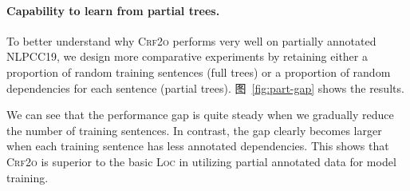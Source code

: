 \paragraph{Capability to learn from partial trees.}

To better understand why \textsc{Crf2o} performs very well on partially annotated NLPCC19,
we design more comparative experiments by retaining either a proportion of random training sentences (full trees) or a proportion of random dependencies for each sentence (partial trees).
图~\ref{fig:part-gap} shows the results.

We can see that the performance gap is quite steady
when we gradually reduce the number of training sentences.
In contrast, the gap clearly becomes larger when each training sentence has less annotated dependencies.
This shows that \textsc{Crf2o} is superior to the basic \textsc{Loc} in
utilizing partial annotated data for model training.






